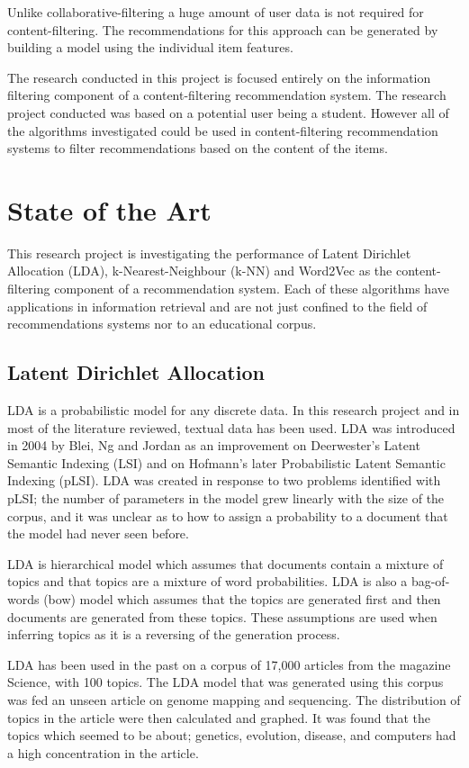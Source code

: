 Unlike collaborative-filtering a huge amount of user data is not required for content-filtering.
The recommendations for this approach can be generated by building a model using the individual item features.

The research conducted in this project is focused entirely on the information filtering component of a content-filtering recommendation system.
The research project conducted was based on a potential user being a student.
However all of the algorithms investigated could be used in content-filtering recommendation systems to filter recommendations based on the content of the items.

\section{State of the Art}
This research project is investigating the performance of Latent Dirichlet Allocation (LDA), k-Nearest-Neighbour (k-NN) and Word2Vec as the content-filtering component of a recommendation system.
Each of these algorithms have applications in information retrieval and are not just confined to the field of recommendations systems nor to an educational corpus.

\subsection{Latent Dirichlet Allocation}
LDA is a probabilistic model for any discrete data. In this research project and in most of the literature reviewed, textual data has been used.
LDA was introduced in 2004 by Blei, Ng and Jordan as an improvement on Deerwester's Latent Semantic Indexing (LSI) and on Hofmann's later Probabilistic Latent Semantic Indexing (pLSI).
LDA was created in response to two problems identified with pLSI; the number of parameters in the model grew linearly with the size of the corpus, and it was unclear as to how to assign a probability to a document that the model had never seen before\cite{LDAintro}.

LDA is hierarchical model which assumes that documents contain a mixture of topics and that topics are a mixture of word probabilities.
LDA is also a bag-of-words (bow) model which assumes that the topics are generated first and then documents are generated from these topics.
These assumptions are used when inferring topics as it is a reversing of the generation process\cite{LDAintro}.

LDA has been used in the past on a corpus of 17,000 articles from the magazine Science, with 100 topics.
The LDA model that was generated using this corpus was fed an unseen article on genome mapping and sequencing.
The distribution of topics in the article were then calculated and graphed.
It was found that the topics which seemed to be about; genetics, evolution, disease, and computers had a high concentration in the article\cite{ACMTopicModel}.


